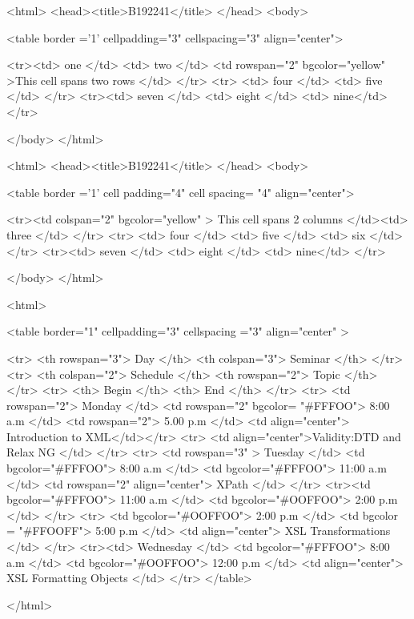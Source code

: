 <html>
<head><title>B192241</title>
</head>
<body>

<table border ='1' cellpadding="3" cellspacing="3" align="center">

<tr><td> one </td> <td> two </td> <td rowspan="2"  bgcolor="yellow" >This cell spans two rows  </td>  </tr>
<tr> <td> four </td> <td> five </td>  </tr>
<tr><td> seven </td> <td> eight </td> <td> nine</td> </tr>
 



</body>
</html>




<html>
<head><title>B192241</title>
</head>
<body>

<table border ='1' cell padding="4" cell spacing= "4" align="center">

<tr><td colspan="2" bgcolor="yellow" > This cell spans 2 columns </td><td> three </td>  </tr>
<tr> <td> four </td> <td> five </td> <td> six </td> </tr>
<tr><td> seven </td> <td> eight </td> <td> nine</td> </tr>
 



</body>
</html>







<html>
 
<table border="1" cellpadding="3" cellspacing ="3" align="center" >

<tr> <th rowspan="3"> Day </th> <th colspan="3"> Seminar   </th> </tr>
<tr> <th colspan="2"> Schedule </th> <th rowspan="2"> Topic </th>  </tr>
<tr> <th> Begin </th> <th> End  </th> </tr>
<tr> <td rowspan="2"> Monday </td> <td rowspan="2" bgcolor= "#FFFOO"> 8:00 a.m  </td> <td rowspan="2"> 5.00 p.m </td> <td align="center"> Introduction to XML</td></tr>
<tr> <td align="center">Validity:DTD and Relax NG </td> </tr>
<tr> <td rowspan="3" > Tuesday </td> <td bgcolor="#FFFOO"> 8:00 a.m </td>  <td bgcolor="#FFFOO"> 11:00 a.m  </td> <td rowspan="2" align="center"> XPath </td> </tr>
<tr><td bgcolor="#FFFOO"> 11:00 a.m </td> <td  bgcolor="#OOFFOO"> 2:00 p.m  </td> </tr>
<tr> <td  bgcolor="#OOFFOO"> 2:00 p.m   </td> <td bgcolor = "#FFOOFF"> 5:00 p.m </td> <td align="center"> XSL Transformations </td> </tr>
<tr><td> Wednesday </td> <td bgcolor="#FFFOO"> 8:00 a.m </td> <td bgcolor="#OOFFOO"> 12:00 p.m </td> <td align="center"> XSL Formatting Objects </td> </tr>
</table>

</html>


 

